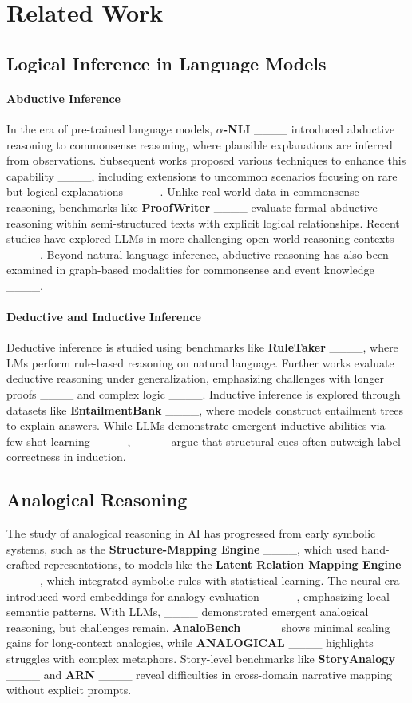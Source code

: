 \section{Related Work}
\subsection{Logical Inference in Language Models}
\paragraph{Abductive Inference}
In the era of pre-trained language models, $\alpha$\textbf{-NLI} ____ introduced abductive reasoning to commonsense reasoning, where plausible explanations are inferred from observations. Subsequent works proposed various techniques to enhance this capability ____, including extensions to uncommon scenarios focusing on rare but logical explanations ____. Unlike real-world data in commonsense reasoning, benchmarks like \textbf{ProofWriter} ____ evaluate formal abductive reasoning within semi-structured texts with explicit logical relationships. Recent studies have explored LLMs in more challenging open-world reasoning contexts ____. Beyond natural language inference, abductive reasoning has also been examined in graph-based modalities for commonsense and event knowledge ____.

\paragraph{Deductive and Inductive Inference}
Deductive inference is studied using benchmarks like \textbf{RuleTaker} ____, where LMs perform rule-based reasoning on natural language. Further works evaluate deductive reasoning under generalization, emphasizing challenges with longer proofs ____ and complex logic ____. Inductive inference is explored through datasets like \textbf{EntailmentBank} ____, where models construct entailment trees to explain answers. While LLMs demonstrate emergent inductive abilities via few-shot learning ____, ____ argue that structural cues often outweigh label correctness in induction.

\subsection{Analogical Reasoning} 
The study of analogical reasoning in AI has progressed from early symbolic systems, such as the \textbf{Structure-Mapping Engine} ____, which used hand-crafted representations, to models like the \textbf{Latent Relation Mapping Engine} ____, which integrated symbolic rules with statistical learning. The neural era introduced word embeddings for analogy evaluation ____, emphasizing local semantic patterns. With LLMs, ____ demonstrated emergent analogical reasoning, but challenges remain. \textbf{AnaloBench} ____ shows minimal scaling gains for long-context analogies, while \textbf{ANALOGICAL} ____ highlights struggles with complex metaphors. Story-level benchmarks like \textbf{StoryAnalogy} ____ and \textbf{ARN} ____ reveal difficulties in cross-domain narrative mapping without explicit prompts.